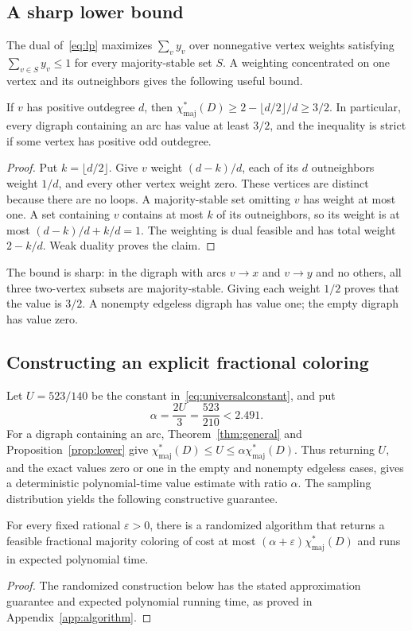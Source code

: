 \documentclass[10pt,a4paper]{article}
\newcommand{\chif}{\chi^*_{\mathrm{maj}}}
\newcommand{\floor}[1]{\lfloor #1\rfloor}
\begin{document}
\subsection{A sharp lower bound}
The dual of~\eqref{eq:lp} maximizes \(\sum_v y_v\) over nonnegative vertex weights satisfying \(\sum_{v\in S}y_v\le1\) for every majority-stable set \(S\). A weighting concentrated on one vertex and its outneighbors gives the following useful bound.
\begin{proposition}\label{prop:lower}
If \(v\) has positive outdegree \(d\), then \(\chif(D)\ge2-\floor{d/2}/d\ge3/2\). In particular, every digraph containing an arc has value at least \(3/2\), and the inequality is strict if some vertex has positive odd outdegree.
\end{proposition}
\begin{proof}
Put \(k=\floor{d/2}\). Give \(v\) weight \((d-k)/d\), each of its \(d\) outneighbors weight \(1/d\), and every other vertex weight zero. These vertices are distinct because there are no loops. A majority-stable set omitting \(v\) has weight at most one. A set containing \(v\) contains at most \(k\) of its outneighbors, so its weight is at most \((d-k)/d+k/d=1\). The weighting is dual feasible and has total weight \(2-k/d\). Weak duality proves the claim.
\end{proof}
The bound is sharp: in the digraph with arcs \(v\to x\) and \(v\to y\) and no others, all three two-vertex subsets are majority-stable. Giving each weight \(1/2\) proves that the value is \(3/2\). A nonempty edgeless digraph has value one; the empty digraph has value zero.

\subsection{Constructing an explicit fractional coloring}\label{sec:positiveapprox}
Let \(U=523/140\) be the constant in~\eqref{eq:universalconstant}, and put
\begin{equation}\label{eq:approxratio}
\alpha=\frac{2U}{3}=\frac{523}{210}<2.491.
\end{equation}
For a digraph containing an arc, Theorem~\ref{thm:general} and Proposition~\ref{prop:lower} give \(\chif(D)\le U\le\alpha\chif(D)\). Thus returning \(U\), and the exact values zero or one in the empty and nonempty edgeless cases, gives a deterministic polynomial-time value estimate with ratio \(\alpha\). The sampling distribution yields the following constructive guarantee.
\begin{corollary}\label{cor:valueapprox}
For every fixed rational $\varepsilon>0$, there is a randomized algorithm that returns a feasible fractional majority coloring of cost at most $(\alpha+\varepsilon)\chif(D)$ and runs in expected polynomial time.
\end{corollary}
\begin{proof}
The randomized construction below has the stated approximation guarantee and expected polynomial running time, as proved in Appendix~\ref{app:algorithm}.
\end{proof}
\end{document}
